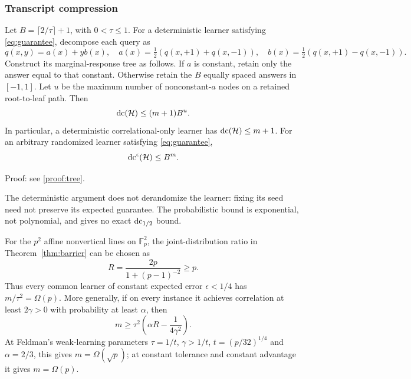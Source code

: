 \subsubsection{Transcript compression}

\begin{theorem}\label{thm:tree}
Let $B=\lceil2/\tau\rceil+1$, with $0<\tau\leq1$. For a deterministic learner satisfying \eqref{eq:guarantee}, decompose each query as
\[
 q(x,y)=a(x)+yb(x),\quad
 a(x)=\tfrac12(q(x,+1)+q(x,-1)),\quad
 b(x)=\tfrac12(q(x,+1)-q(x,-1)).
\]
Construct its marginal-response tree as follows. If $a$ is constant, retain only the answer equal to that constant. Otherwise retain the $B$ equally spaced answers in $[-1,1]$. Let $u$ be the maximum number of nonconstant-$a$ nodes on a retained root-to-leaf path. Then
\begin{equation}\label{eq:tree}
 \operatorname{dc}(\mathcal H)\leq(m+1)B^u.
\end{equation}
In particular, a deterministic correlational-only learner has $\operatorname{dc}(\mathcal H)\leq m+1$.
For an arbitrary randomized learner satisfying \eqref{eq:guarantee},
\begin{equation}\label{eq:approx}
 \operatorname{dc}^{\epsilon}(\mathcal H)\leq B^m.
\end{equation}
\end{theorem}

\noindent Proof: see \cref{proof:tree}.\par


The deterministic argument does not derandomize the learner: fixing its seed need not preserve its expected guarantee. The probabilistic bound is exponential, not polynomial, and gives no exact $\operatorname{dc}_{1/2}$ bound.



\begin{proposition}\label{prop:affine}
For the $p^2$ affine nonvertical lines on $\mathbb F_p^2$, the joint-distribution ratio in Theorem~\ref{thm:barrier} can be chosen as
\[
 R=\frac{2p}{1+(p-1)^{-2}}\ge p.
\]
Thus every common learner of constant expected error $\epsilon<1/4$ has $m/\tau^2=\Omega(p)$. More generally, if on every instance it achieves correlation at least $2\gamma>0$ with probability at least $\alpha$, then
\[
 m\ge\tau^2\left(\alpha R-\frac1{4\gamma^2}\right).
\]
At Feldman's weak-learning parameters $\tau=1/t$, $\gamma>1/t$, $t=(p/32)^{1/4}$ and $\alpha=2/3$, this gives $m=\Omega(\sqrt p)$; at constant tolerance and constant advantage it gives $m=\Omega(p)$.
\end{proposition}

